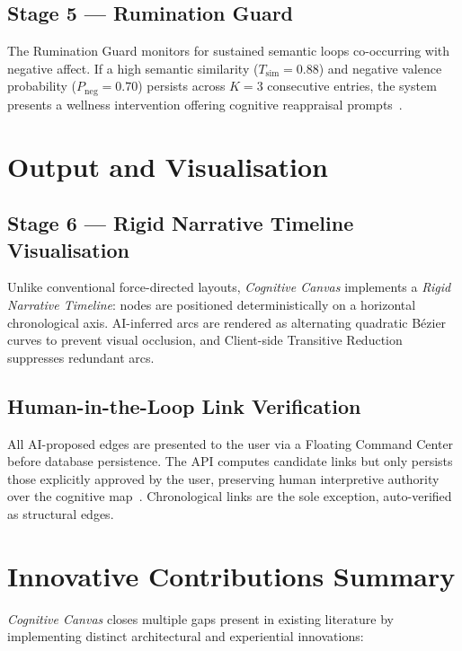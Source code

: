 \documentclass[12pt]{article}
\newcommand{\CC}{\textit{Cognitive Canvas}}
\begin{document}
\subsection{Stage 5 --- Rumination Guard}
The Rumination Guard monitors for sustained semantic loops co-occurring with negative affect. If a high semantic similarity ($T_{\mathrm{sim}} = 0.88$) and negative valence probability ($P_{\mathrm{neg}} = 0.70$) persists across $K = 3$ consecutive entries, the system presents a wellness intervention offering cognitive reappraisal prompts~\cite{greenberger1995}.

\section{Output and Visualisation}

\subsection{Stage 6 --- Rigid Narrative Timeline Visualisation}
Unlike conventional force-directed layouts, \CC{} implements a \emph{Rigid Narrative Timeline}: nodes are positioned deterministically on a horizontal chronological axis. AI-inferred arcs are rendered as alternating quadratic B\'{e}zier curves to prevent visual occlusion, and Client-side Transitive Reduction~\cite{aho1972} suppresses redundant arcs.

\subsection{Human-in-the-Loop Link Verification}
All AI-proposed edges are presented to the user via a Floating Command Center before database persistence. The API computes candidate links but only persists those explicitly approved by the user, preserving human interpretive authority over the cognitive map~\cite{amershi2014,horvitz1999}. Chronological links are the sole exception, auto-verified as structural edges.

\section{Innovative Contributions Summary}

\CC{} closes multiple gaps present in existing literature by implementing distinct architectural and experiential innovations:
\end{document}
